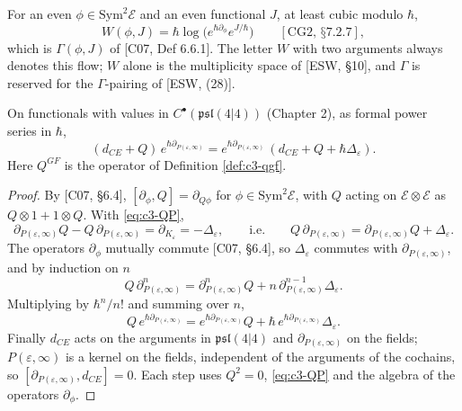 \begin{definition}
\label{def:c3-W}
For an even $\phi\in\mathrm{Sym}^2\mathscr E$ and an even functional $J$, at least cubic modulo $\hbar$,
\[
W(\phi,J)=\hbar\log\big(e^{\hbar\partial_\phi}e^{J/\hbar}\big)\qquad[\text{CG2, §7.2.7}],
\]
which is $\Gamma(\phi,J)$ of [C07, Def 6.6.1]. The letter $W$ with two arguments always denotes this flow; $W$ alone is the multiplicity space of [ESW, §10], and $\Gamma$ is reserved for the $\Gamma$-pairing of [ESW, (28)].
\end{definition}

\begin{theorem}
\label{thm:c3-uv}
On functionals with values in $C^\bullet(\mathfrak{psl}(4|4))$ (Chapter 2), as formal power series in $\hbar$,
\begin{equation}
(d_{CE}+Q)\,e^{\hbar\partial_{P(\varepsilon,\infty)}}=e^{\hbar\partial_{P(\varepsilon,\infty)}}\,(d_{CE}+Q+\hbar\Delta_\varepsilon).
\label{eq:c3-uv}
\end{equation}
Here $Q^{GF}$ is the operator of Definition \ref{def:c3-qgf}.
\end{theorem}

\begin{proof}
By [C07, §6.4], $[\partial_\phi,Q]=\partial_{Q\phi}$ for $\phi\in\mathrm{Sym}^2\mathscr E$, with $Q$ acting on $\mathscr E\otimes\mathscr E$ as $Q\otimes1+1\otimes Q$. With \eqref{eq:c3-QP},
\[
\partial_{P(\varepsilon,\infty)}Q-Q\,\partial_{P(\varepsilon,\infty)}=\partial_{K_\varepsilon}=-\Delta_\varepsilon ,\qquad\text{i.e.}\qquad Q\,\partial_{P(\varepsilon,\infty)}=\partial_{P(\varepsilon,\infty)}Q+\Delta_\varepsilon .
\]
The operators $\partial_\phi$ mutually commute [C07, §6.4], so $\Delta_\varepsilon$ commutes with $\partial_{P(\varepsilon,\infty)}$, and by induction on $n$
\[
Q\,\partial_{P(\varepsilon,\infty)}^n=\partial_{P(\varepsilon,\infty)}^nQ+n\,\partial_{P(\varepsilon,\infty)}^{n-1}\Delta_\varepsilon .
\]
Multiplying by $\hbar^n/n!$ and summing over $n$,
\[
Q\,e^{\hbar\partial_{P(\varepsilon,\infty)}}=e^{\hbar\partial_{P(\varepsilon,\infty)}}Q+\hbar\,e^{\hbar\partial_{P(\varepsilon,\infty)}}\Delta_\varepsilon .
\]
Finally $d_{CE}$ acts on the arguments in $\mathfrak{psl}(4|4)$ and $\partial_{P(\varepsilon,\infty)}$ on the fields; $P(\varepsilon,\infty)$ is a kernel on the fields, independent of the arguments of the cochains, so $[\partial_{P(\varepsilon,\infty)},d_{CE}]=0$. Each step uses $Q^2=0$, \eqref{eq:c3-QP} and the algebra of the operators $\partial_\phi$.
\end{proof}

